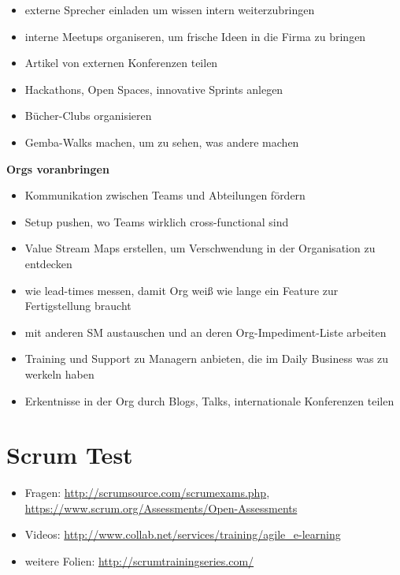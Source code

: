 \begin{itemize}
  \item externe Sprecher einladen um wissen intern weiterzubringen
  \item interne Meetups organiseren, um frische Ideen in die Firma zu bringen
  \item Artikel von externen Konferenzen teilen
  \item Hackathons, Open Spaces, innovative Sprints anlegen
  \item Bücher-Clubs organisieren
  \item Gemba-Walks machen, um zu sehen, was andere machen
\end{itemize}


\textbf{Orgs voranbringen}

\begin{itemize}
  \item Kommunikation zwischen Teams und Abteilungen fördern
  \item Setup pushen, wo Teams wirklich cross-functional sind
  \item Value Stream Maps erstellen, um Verschwendung in der Organisation zu entdecken
  \item wie lead-times messen, damit Org weiß wie lange ein Feature zur Fertigstellung braucht
  \item mit anderen SM austauschen und an deren Org-Impediment-Liste arbeiten
  \item Training und Support zu Managern anbieten, die im Daily Business was zu werkeln haben
  \item Erkentnisse in der Org durch Blogs, Talks, internationale Konferenzen teilen
\end{itemize}

\pagebreak

\section{Scrum Test}

\begin{itemize}
  \item Fragen: \url{http://scrumsource.com/scrumexams.php}, \url{https://www.scrum.org/Assessments/Open-Assessments}
  \item Videos: \url{http://www.collab.net/services/training/agile_e-learning}
  \item weitere Folien: \url{http://scrumtrainingseries.com/}
\end{itemize}


